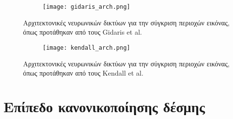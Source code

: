 \begin{figure}
	\begin{subfigure}{1\textwidth}
		\texttt{[image: gidaris\_arch.png]}
	\end{subfigure}
	\caption{Αρχιτεκτονικές νευρωνικών δικτύων για την σύγκριση περιοχών εικόνας, όπως προτάθηκαν από τους \e Gidaris et al. \g \citep{gidaris2016detect}}
	\label{fig:gydaris}
	\begin{subfigure}{\textwidth}
		\texttt{[image: kendall\_arch.png]}
	\end{subfigure}
	\caption{Αρχιτεκτονικές νευρωνικών δικτύων για την σύγκριση περιοχών εικόνας, όπως προτάθηκαν από τους \e Kendall et al. \g \citep{gidaris2016detect}}
	\label{fig:kendall}
\end{figure}

	
\section{Επίπεδο κανονικοποίησης δέσμης}
\label{appendix:BN}

